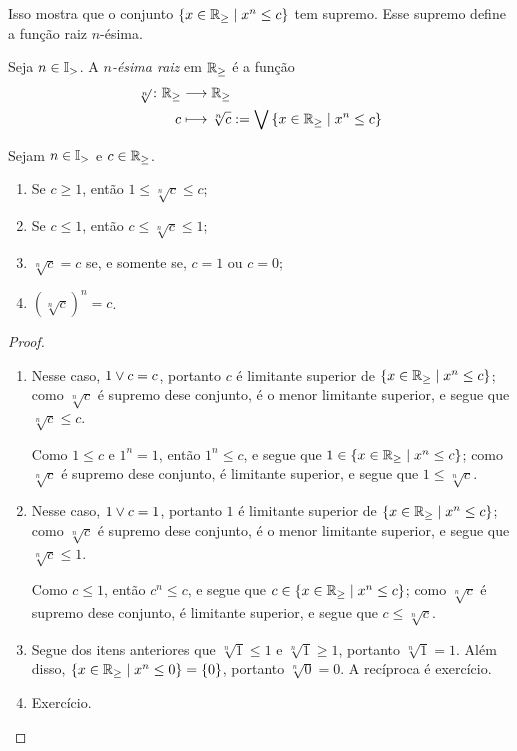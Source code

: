 Isso mostra que o conjunto $\left\{{x \in \mathbb{R}_{\geq}}\;\middle\vert\;{x^n \leq c}\right\}$ tem supremo. Esse supremo define a função raiz $n$-ésima.

\begin{definition}
Seja $n \in \mathbb{I}_{>}$. A \emph{$n$-ésima raiz} em $\mathbb{R}_{\geq}$ é a função
	\begin{align*}
	{\sqrt[n]{}}\colon {\mathbb{R}_{\geq}} &\longrightarrow {\mathbb{R}_{\geq}} \\{c} &\longmapsto \sqrt[n]{c} := \bigvee \left\{{x \in \mathbb{R}_{\geq}}\;\middle\vert\;{x^n \leq c}\right\}
	\end{align*}
\end{definition}

\begin{proposition}
Sejam $n \in \mathbb{I}_{>}$ e $c \in \mathbb{R}_{\geq}$.
	\begin{enumerate}
	\item Se $c \geq 1$, então $1 \leq \sqrt[n]{c} \leq c$;
	\item Se $c \leq 1$, então $c \leq \sqrt[n]{c} \leq 1$;
	\item $\sqrt[n]{c} = c$ se, e somente se, $c=1$ ou $c=0$;
	\item $(\sqrt[n]{c})^n = c$.
	\end{enumerate}
\end{proposition}
\begin{proof}
	\begin{enumerate}
	\item Nesse caso, $1 \mathbin{\vee} c = c$, portanto $c$ é limitante superior de $\left\{{x \in \mathbb{R}_{\geq}}\;\middle\vert\;{x^n \leq c}\right\}$; como $\sqrt[n]{c}$ é supremo dese conjunto, é o menor limitante superior, e segue que $\sqrt[n]{c} \leq c$.
	
	Como $1 \leq c$ e $1^n = 1$, então $1^n \leq c$, e segue que $1 \in \left\{{x \in \mathbb{R}_{\geq}}\;\middle\vert\;{x^n \leq c}\right\}$; como $\sqrt[n]{c}$ é supremo dese conjunto, é limitante superior, e segue que $1 \leq \sqrt[n]{c}$.

	\item Nesse caso, $1 \mathbin{\vee} c = 1$, portanto $1$ é limitante superior de $\left\{{x \in \mathbb{R}_{\geq}}\;\middle\vert\;{x^n \leq c}\right\}$; como $\sqrt[n]{c}$ é supremo dese conjunto, é o menor limitante superior, e segue que $\sqrt[n]{c} \leq 1$.
	
	Como $c \leq 1$, então $c^n \leq c$, e segue que $c \in \left\{{x \in \mathbb{R}_{\geq}}\;\middle\vert\;{x^n \leq c}\right\}$; como $\sqrt[n]{c}$ é supremo dese conjunto, é limitante superior, e segue que $c \leq \sqrt[n]{c}$.

	\item Segue dos itens anteriores que $\sqrt[n]{1} \leq 1$ e $\sqrt[n]{1} \geq 1$, portanto $\sqrt[n]{1} = 1$. Além disso, $\left\{{x \in \mathbb{R}_{\geq}}\;\middle\vert\;{x^n \leq 0}\right\} = \{0\}$, portanto $\sqrt[n]{0} = 0$. A recíproca é exercício.

	\item Exercício.
	\end{enumerate}
\end{proof}


